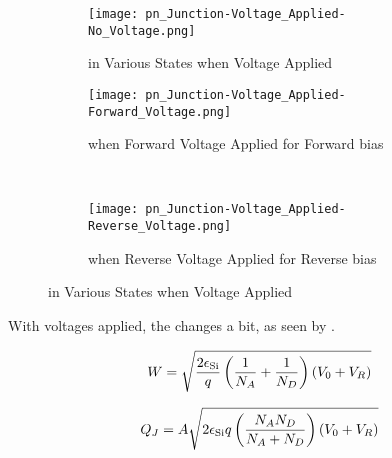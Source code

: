 \begin{figure}[h!tbp]
  \centering
  \begin{subfigure}{0.48\linewidth}
    \centering
    \texttt{[image: pn\_Junction-Voltage\_Applied-No\_Voltage.png]}
    \caption{\PNJunction{} in Various States when Voltage Applied}
    \label{fig:pn_Junction-Voltage_Applied-No_Voltage}
  \end{subfigure}
  \begin{subfigure}{0.48\linewidth}
    \centering
    \texttt{[image: pn\_Junction-Voltage\_Applied-Forward\_Voltage.png]}
    \caption{\PNJunction{} when Forward Voltage Applied for Forward bias}
    \label{fig:pn_Junction-Voltage_Applied-Forward_Voltage}
  \end{subfigure}
  \\
  \begin{subfigure}{0.48\linewidth}
    \centering
    \texttt{[image: pn\_Junction-Voltage\_Applied-Reverse\_Voltage.png]}
    \caption{\PNJunction{} when Reverse Voltage Applied for Reverse bias}
    \label{fig:pn_Junction-Voltage_Applied-Reverse_Voltage}
  \end{subfigure}
  \caption{\PNJunction{} in Various States when Voltage Applied \parencite[p.~156]{sedraTextbook7}}
  \label{fig:pn_Junction-Voltage_Applied}
\end{figure}

With voltages applied, the  changes a bit, as seen by .

\begin{equation}\label{eq:Depletion_Layer_Width-Voltage_Applied}
  W = \sqrt{\frac{2 \epsilon_{\mathrm{Si}}}{q} \left( \frac{1}{N_{A}} + \frac{1}{N_{D}} \right) (V_{0} + V_{R})}
\end{equation}

\begin{equation}\label{eq:Depletion_Layer_Charge-Voltage_Applied}
  Q_{J} = A \sqrt{2 \epsilon_{\mathrm{Si}} q \left( \frac{N_{A} N_{D}}{N_{A} + N_{D}} \right) (V_{0} + V_{R})}
\end{equation}

